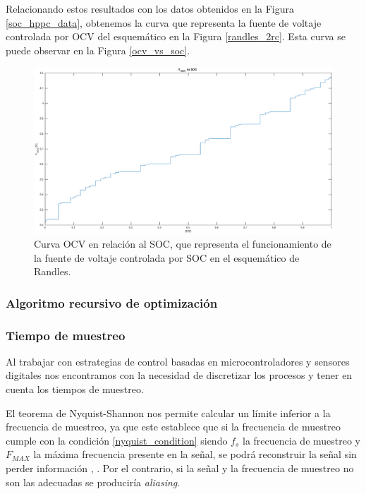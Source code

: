 \documentclass[10pt,a4paper]{article}
\begin{document}
Relacionando estos resultados con los datos obtenidos en la Figura 
\ref{soc_hppc_data}, obtenemos la curva que representa la fuente de voltaje
controlada por \acrshort{OCV} del esquem\'atico en la Figura \ref{randles_2rc}.
Esta curva se puede observar en la Figura \ref{ocv_vs_soc}.

\begin{figure}[h!]
    \begin{center}
        \includegraphics[width=.7\textwidth]{ocv_vs_soc.eps}
        \caption{Curva \acrshort{OCV} en relaci\'on al \acrshort{SOC}, que
        representa el funcionamiento de la fuente de voltaje controlada por
        \acrshort{SOC} en el esquem\'atico de Randles.}
    \end{center}
\end{figure}

\subsubsection{Algoritmo recursivo de optimizaci\'on}

\subsubsection{Tiempo de muestreo}
Al trabajar con estrategias de control basadas en microcontroladores y sensores
digitales nos encontramos con la necesidad de discretizar los procesos y tener
en cuenta los tiempos de muestreo.

El teorema de Nyquist-Shannon nos permite calcular un límite inferior a la
frecuencia de muestreo, ya que este establece que si la frecuencia de muestreo
cumple con la condición \ref{nyquist_condition} siendo $f_s$ la frecuencia de
muestreo y $F_{MAX}$ la máxima frecuencia presente en la señal, se podrá
reconstruir la señal sin perder información \cite{Nyquist1928},
\cite{Shannon1949}.  Por el contrario, si la señal y la frecuencia de muestreo
no son las adecuadas se produciría \emph{aliasing}.
\end{document}
